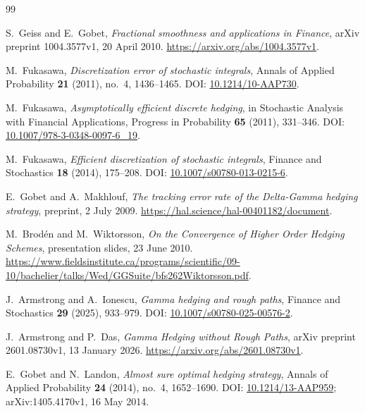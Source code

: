 \documentclass[11pt,a4paper]{amsart}
\theoremstyle{plain}
\theoremstyle{definition}
\theoremstyle{remark}
\begin{document}
\begin{thebibliography}{99}

S.~Geiss and E.~Gobet,
\emph{Fractional smoothness and applications in Finance},
arXiv preprint 1004.3577v1, 20 April 2010.
\newblock \url{https://arxiv.org/abs/1004.3577v1}.

M.~Fukasawa,
\emph{Discretization error of stochastic integrals},
Annals of Applied Probability \textbf{21} (2011), no.~4, 1436--1465.
\newblock DOI: \href{https://doi.org/10.1214/10-AAP730}{10.1214/10-AAP730}.

M.~Fukasawa,
\emph{Asymptotically efficient discrete hedging},
in Stochastic Analysis with Financial Applications,
Progress in Probability \textbf{65} (2011), 331--346.
\newblock DOI: \href{https://doi.org/10.1007/978-3-0348-0097-6_19}{10.1007/978-3-0348-0097-6\_19}.

M.~Fukasawa,
\emph{Efficient discretization of stochastic integrals},
Finance and Stochastics \textbf{18} (2014), 175--208.
\newblock DOI: \href{https://doi.org/10.1007/s00780-013-0215-6}{10.1007/s00780-013-0215-6}.

E.~Gobet and A.~Makhlouf,
\emph{The tracking error rate of the Delta-Gamma hedging strategy},
preprint, 2 July 2009.
\newblock \url{https://hal.science/hal-00401182/document}.

M.~Brod\'en and M.~Wiktorsson,
\emph{On the Convergence of Higher Order Hedging Schemes},
presentation slides, 23 June 2010.
\newblock \url{https://www.fieldsinstitute.ca/programs/scientific/09-10/bachelier/talks/Wed/GGSuite/bfs262Wiktorsson.pdf}.

J.~Armstrong and A.~Ionescu,
\emph{Gamma hedging and rough paths},
Finance and Stochastics \textbf{29} (2025), 933--979.
\newblock DOI: \href{https://doi.org/10.1007/s00780-025-00576-2}{10.1007/s00780-025-00576-2}.

J.~Armstrong and P.~Das,
\emph{Gamma Hedging without Rough Paths},
arXiv preprint 2601.08730v1, 13 January 2026.
\newblock \url{https://arxiv.org/abs/2601.08730v1}.

E.~Gobet and N.~Landon,
\emph{Almost sure optimal hedging strategy},
Annals of Applied Probability \textbf{24} (2014), no.~4, 1652--1690.
\newblock DOI: \href{https://doi.org/10.1214/13-AAP959}{10.1214/13-AAP959};
arXiv:1405.4170v1, 16 May 2014.

\end{thebibliography}
\end{document}
